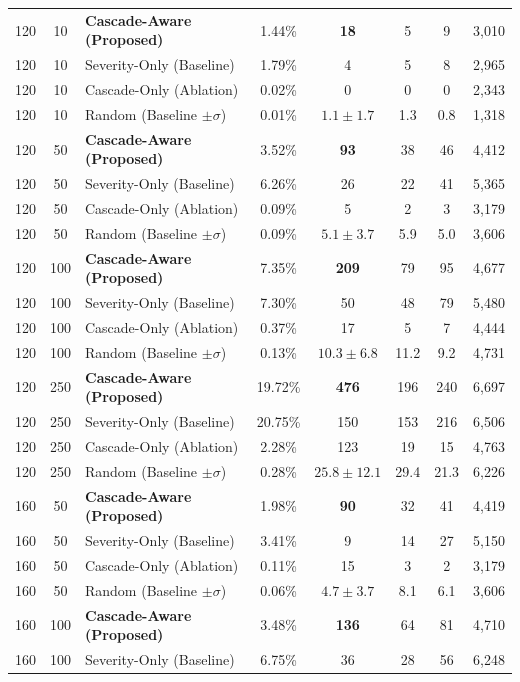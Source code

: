 \documentclass[12pt,a4paper]{report}
\begin{document}
\begin{table}[h!]
\begin{tabular}{|c|c|l|c|c|c|c|c|}
\hline
\hline
120 & 10 & \textbf{Cascade-Aware (Proposed)} & 1.44\% & \textbf{18} & 5 & 9 & 3,010 \\
120 & 10 & Severity-Only (Baseline) & 1.79\% & 4 & 5 & 8 & 2,965 \\
120 & 10 & Cascade-Only (Ablation) & 0.02\% & 0 & 0 & 0 & 2,343 \\
120 & 10 & Random (Baseline $\pm \sigma$) & 0.01\% & $1.1 \pm 1.7$ & 1.3 & 0.8 & 1,318 \\
\hline
120 & 50 & \textbf{Cascade-Aware (Proposed)} & 3.52\% & \textbf{93} & 38 & 46 & 4,412 \\
120 & 50 & Severity-Only (Baseline) & 6.26\% & 26 & 22 & 41 & 5,365 \\
120 & 50 & Cascade-Only (Ablation) & 0.09\% & 5 & 2 & 3 & 3,179 \\
120 & 50 & Random (Baseline $\pm \sigma$) & 0.09\% & $5.1 \pm 3.7$ & 5.9 & 5.0 & 3,606 \\
\hline
120 & 100 & \textbf{Cascade-Aware (Proposed)} & 7.35\% & \textbf{209} & 79 & 95 & 4,677 \\
120 & 100 & Severity-Only (Baseline) & 7.30\% & 50 & 48 & 79 & 5,480 \\
120 & 100 & Cascade-Only (Ablation) & 0.37\% & 17 & 5 & 7 & 4,444 \\
120 & 100 & Random (Baseline $\pm \sigma$) & 0.13\% & $10.3 \pm 6.8$ & 11.2 & 9.2 & 4,731 \\
\hline
120 & 250 & \textbf{Cascade-Aware (Proposed)} & 19.72\% & \textbf{476} & 196 & 240 & 6,697 \\
120 & 250 & Severity-Only (Baseline) & 20.75\% & 150 & 153 & 216 & 6,506 \\
120 & 250 & Cascade-Only (Ablation) & 2.28\% & 123 & 19 & 15 & 4,763 \\
120 & 250 & Random (Baseline $\pm \sigma$) & 0.28\% & $25.8 \pm 12.1$ & 29.4 & 21.3 & 6,226 \\
\hline
\hline
160 & 50 & \textbf{Cascade-Aware (Proposed)} & 1.98\% & \textbf{90} & 32 & 41 & 4,419 \\
160 & 50 & Severity-Only (Baseline) & 3.41\% & 9 & 14 & 27 & 5,150 \\
160 & 50 & Cascade-Only (Ablation) & 0.11\% & 15 & 3 & 2 & 3,179 \\
160 & 50 & Random (Baseline $\pm \sigma$) & 0.06\% & $4.7 \pm 3.7$ & 8.1 & 6.1 & 3,606 \\
\hline
160 & 100 & \textbf{Cascade-Aware (Proposed)} & 3.48\% & \textbf{136} & 64 & 81 & 4,710 \\
160 & 100 & Severity-Only (Baseline) & 6.75\% & 36 & 28 & 56 & 6,248 \\

\end{tabular}
\end{table}
\end{document}
